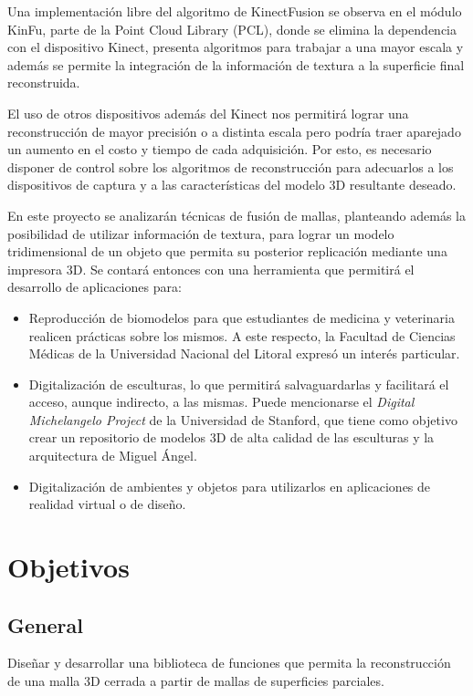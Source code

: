 	Una implementación libre del algoritmo de KinectFusion se observa en el módulo KinFu,
	parte de la Point Cloud Library (PCL),
	donde se elimina la dependencia con el dispositivo Kinect,
	presenta algoritmos para trabajar a una mayor escala
	y además se permite la integración de la información de textura a la superficie final reconstruida.

	El uso de otros dispositivos además del Kinect nos permitirá lograr una reconstrucción de mayor precisión o a distinta escala pero podría traer aparejado un aumento en el costo y tiempo de cada adquisición.
	Por esto, es necesario disponer de control sobre los algoritmos de reconstrucción para adecuarlos a los dispositivos de captura y a las características del modelo 3D resultante deseado.

	En este proyecto se analizarán técnicas de fusión de mallas,
	planteando además la posibilidad de utilizar información de textura,
	para lograr un modelo tridimensional de un objeto que permita su posterior replicación
	mediante una impresora 3D.
	Se contará entonces con una herramienta que permitirá el desarrollo de aplicaciones para:
	\begin{itemize}
		\item Reproducción de biomodelos para que estudiantes de medicina y veterinaria realicen prácticas sobre los mismos.
			A este respecto, la Facultad de Ciencias Médicas de la Universidad Nacional del Litoral expresó un interés particular.
		\item Digitalización de esculturas, lo que permitirá salvaguardarlas y facilitará el acceso, aunque indirecto, a las mismas.
			Puede mencionarse el \emph{Digital Michelangelo Project} de la Universidad de Stanford, que tiene como objetivo crear un repositorio de modelos 3D de alta calidad de las esculturas y la arquitectura de Miguel Ángel.
		\item Digitalización de ambientes y objetos para utilizarlos en aplicaciones de realidad virtual o de diseño.
	\end{itemize}

	\section{Objetivos}
		\subsection{General}
			Diseñar y desarrollar una biblioteca de funciones que permita
			la reconstrucción de una malla 3D cerrada a partir de mallas de superficies parciales.
